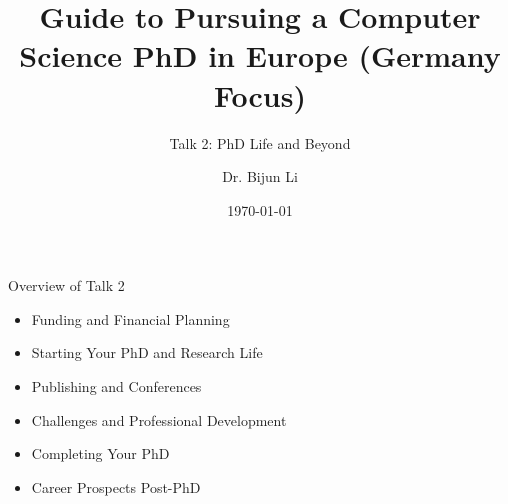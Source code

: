 \documentclass[aspectratio=169,10pt]{beamer}
\title{Guide to Pursuing a Computer Science PhD in Europe (Germany Focus)}
\subtitle{Talk 2: PhD Life and Beyond}
\date{\today}
\author{Dr. Bijun Li}
\institute{Expert in International Computer Science Research}
\begin{document}
\maketitle

\begin{frame}{Overview of Talk 2}
    \begin{itemize}
        \item Funding and Financial Planning
        \item Starting Your PhD and Research Life
        \item Publishing and Conferences
        \item Challenges and Professional Development
        \item Completing Your PhD
        \item Career Prospects Post-PhD
    \end{itemize}
\end{frame}
\end{document}
